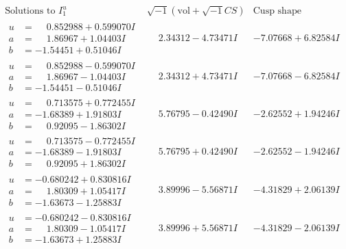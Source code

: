 \documentclass[1p]{elsarticle_modified}
\theoremstyle{definition}
\newcommand{\I}{\sqrt{-1}}
\begin{document}
$$\begin{array}{c|c|c}  
\text{Solutions to }I^u_{1}& \I (\text{vol} + \sqrt{-1}CS) & \text{Cusp shape}\\
 \hline 
\begin{aligned}
u &= \phantom{-}0.852988 + 0.599070 I \\
a &= \phantom{-}1.86967 + 1.04403 I \\
b &= -1.54451 + 0.51046 I\end{aligned}
 & \phantom{-}2.34312 - 4.73471 I & -7.07668 + 6.82584 I \\ \hline\begin{aligned}
u &= \phantom{-}0.852988 - 0.599070 I \\
a &= \phantom{-}1.86967 - 1.04403 I \\
b &= -1.54451 - 0.51046 I\end{aligned}
 & \phantom{-}2.34312 + 4.73471 I & -7.07668 - 6.82584 I \\ \hline\begin{aligned}
u &= \phantom{-}0.713575 + 0.772455 I \\
a &= -1.68389 + 1.91803 I \\
b &= \phantom{-}0.92095 - 1.86302 I\end{aligned}
 & \phantom{-}5.76795 - 0.42490 I & -2.62552 + 1.94246 I \\ \hline\begin{aligned}
u &= \phantom{-}0.713575 - 0.772455 I \\
a &= -1.68389 - 1.91803 I \\
b &= \phantom{-}0.92095 + 1.86302 I\end{aligned}
 & \phantom{-}5.76795 + 0.42490 I & -2.62552 - 1.94246 I \\ \hline\begin{aligned}
u &= -0.680242 + 0.830816 I \\
a &= \phantom{-}1.80309 + 1.05417 I \\
b &= -1.63673 - 1.25883 I\end{aligned}
 & \phantom{-}3.89996 - 5.56871 I & -4.31829 + 2.06139 I \\ \hline\begin{aligned}
u &= -0.680242 - 0.830816 I \\
a &= \phantom{-}1.80309 - 1.05417 I \\
b &= -1.63673 + 1.25883 I\end{aligned}
 & \phantom{-}3.89996 + 5.56871 I & -4.31829 - 2.06139 I \\ \hline\begin{aligned}

\end{aligned}
\end{array}$$
\end{document}
